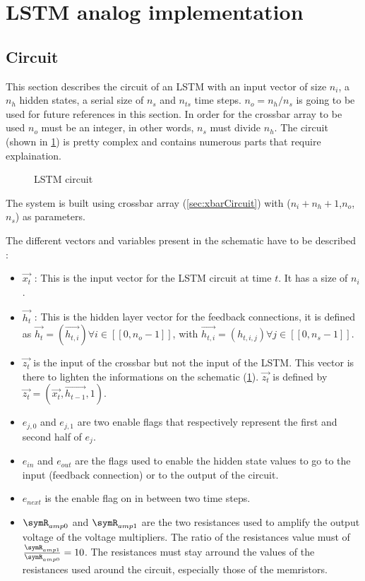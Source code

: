 \section{\ac{LSTM} analog implementation}\label{sec:lstmCircuit}

\subsection{Circuit}

This section describes the circuit of an \ac{LSTM} with an input vector of size $n_i$, a $n_h$ hidden states, a serial size of $n_s$ and $n_{ts}$ time steps. $n_o=n_h/n_s$ is going to be used for future references in this section. In order for the crossbar array to be used $n_o$ must be an integer, in other words, $n_s$ must divide $n_h$. The circuit (shown in \cref{circt:lstm}) is pretty complex and contains numerous parts that require explaination.

\begin{figure}[H]
  \centering
  
  \caption{\ac{LSTM} circuit}
  \label{circt:lstm}
\end{figure}

The system is built using crossbar array (\cref{sec:xbarCircuit}) with ($n_i+n_h+1$,$n_o$, $n_s$) as parameters.

The different vectors and variables present in the schematic have to be described :

\begin{itemize}
  \item $\overrightarrow{x_t}$ : This is the input vector for the \ac{LSTM} circuit at time $t$. It has a size of $n_i$.
  \item $\overrightarrow{h_t}$ : This is the hidden layer vector for the feedback connections, it is defined as $\overrightarrow{h_t}=(\overrightarrow{h_{t,i}}) \forall i\in [\![0,n_o-1]\!]$, with $\overrightarrow{h_{t,i}}=(h_{t,i,j}) \forall j\in [\![0,n_s-1]\!]$.
  \item $\overrightarrow{z_t}$ is the input of the crossbar but not the input of the \ac{LSTM}. This vector is there to lighten the informations on the schematic (\cref{circt:lstm}). $\overrightarrow{z_t}$ is defined by $\overrightarrow{z_t}=(\overrightarrow{x_t},\overrightarrow{h_{t-1}},1)$.
  \item $e_{j,0}$ and $e_{j,1}$ are two enable flags that respectively represent the first and second half of $e_j$.
  \item $e_{in}$ and $e_{out}$ are the flags used to enable the hidden state values to go to the input (feedback connection) or to the output of the circuit.
  \item $e_{next}$ is the enable flag on in between two time steps.
  \item $\symR_{amp0}$ and $\symR_{amp1}$ are the two resistances used to amplify the output voltage of the voltage multipliers. The ratio of the resistances value must of $\frac{\symR_{amp1}}{\symR_{amp0}}=10$. The resistances must stay arround the values of the resistances used around the circuit, especially those of the memristors.
\end{itemize}

